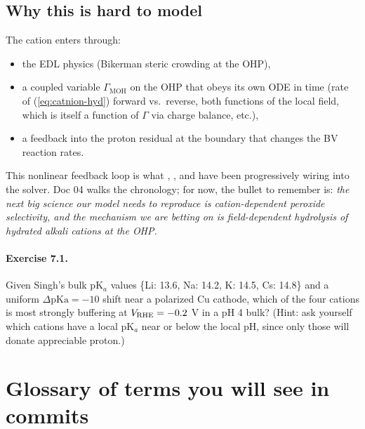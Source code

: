 \documentclass[11pt]{article}
\begin{document}
\subsection{Why this is hard to model}

The cation enters through:
\begin{itemize}[leftmargin=*]
\item the EDL physics (Bikerman steric crowding at the OHP),
\item a coupled  variable
      $\Gamma_{\mathrm{MOH}}$ on the OHP that obeys
      its own ODE in time (rate of (\ref{eq:catnion-hyd}) forward
      vs.\ reverse, both functions of the local field, which is
      itself a function of $\Gamma$ via charge balance, etc.),
\item a feedback into the proton residual at the boundary that
      changes the BV reaction rates.
\end{itemize}
This nonlinear feedback loop is what ,
, and  have been progressively wiring
into the solver. Doc 04 walks the chronology; for now, the bullet
to remember is: \emph{the next big science our model needs to
reproduce is cation-dependent peroxide selectivity, and the
mechanism we are betting on is field-dependent hydrolysis of
hydrated alkali cations at the OHP.}

\paragraph{Exercise 7.1.} Given Singh's bulk pK$_a$ values
\{Li: 13.6, Na: 14.2, K: 14.5, Cs: 14.8\} and a uniform
$\Delta \mathrm{pKa} = -10$ shift near a polarized Cu cathode, which
of the four cations is most strongly buffering at $V_{\mathrm{RHE}} = -0.2$ V
in a pH 4 bulk? (Hint: ask yourself which cations have a local
pK$_a$ near or below the local pH, since only those will donate
appreciable proton.)

\section{Glossary of terms you will see in commits}
\end{document}
